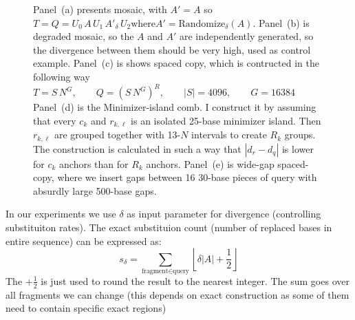 \begin{figure}[p]
\caption{Panel~(a)
presents mosaic, with \(A'=A\) so $T = Q = U_0\,A\,U_1\,A'_{\delta}\,U_2 \text{where} A' = \text{Randomize}_{\delta}(A)$.  Panel~(b) is degraded mosaic, so the $A$ and $A'$ are independently generated, so the divergence between them should be very high, used as control example.  Panel~(c) is
shows spaced copy, which is contructed in the following way $T=S\,N^G,
\qquad
Q=(S\,N^G)^R,
\qquad
\lvert S\rvert=4096,
\qquad
G=16384$ Panel~(d) is the Minimizer-island comb. I construct it by assuming that every \(c_k\) and \(r_{k,\ell}\) is
an isolated 25-base minimizer island. Then \(r_{k,\ell}\) are grouped together with 13-$N$ intervals to create $R_k$ groups. The construction is calculated in such a way that $|d_r - d_q|$ is lower for $c_k$ anchors than for $R_k$ anchors.
Panel~(e) is wide-gap spaced-copy, where we insert gaps between 16 30-base pieces of query with absurdly large 500-base gaps.}
\label{fig:chaining-runl-inputs}
\end{figure}


In our experiments we use $\delta$ as input parameter for divergence (controlling substituiton rates). The exact substituion count (number of replaced bases in entire sequence) can be expressed as:
\begin{equation}
  s_{\delta} = \sum_{\text{fragment} \in \text{query}} \left\lfloor\delta\lvert A\rvert+\frac{1}{2}\right\rfloor
\end{equation}
The $+\frac{1}{2}$ is just used to round the result to the nearest integer. The sum goes over all fragments we can change (this depends on exact construction as some of them need to contain specific exact regions)

